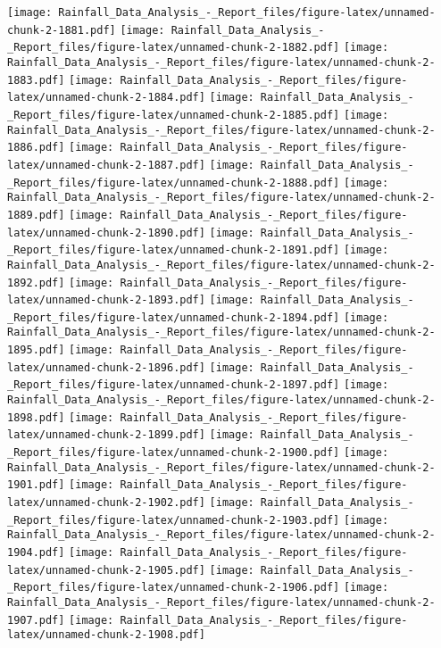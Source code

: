 \documentclass[
]{article}
\begin{document}
\texttt{[image: Rainfall\_Data\_Analysis\_-\_Report\_files/figure-latex/unnamed-chunk-2-1881.pdf]}
\texttt{[image: Rainfall\_Data\_Analysis\_-\_Report\_files/figure-latex/unnamed-chunk-2-1882.pdf]}
\texttt{[image: Rainfall\_Data\_Analysis\_-\_Report\_files/figure-latex/unnamed-chunk-2-1883.pdf]}
\texttt{[image: Rainfall\_Data\_Analysis\_-\_Report\_files/figure-latex/unnamed-chunk-2-1884.pdf]}
\texttt{[image: Rainfall\_Data\_Analysis\_-\_Report\_files/figure-latex/unnamed-chunk-2-1885.pdf]}
\texttt{[image: Rainfall\_Data\_Analysis\_-\_Report\_files/figure-latex/unnamed-chunk-2-1886.pdf]}
\texttt{[image: Rainfall\_Data\_Analysis\_-\_Report\_files/figure-latex/unnamed-chunk-2-1887.pdf]}
\texttt{[image: Rainfall\_Data\_Analysis\_-\_Report\_files/figure-latex/unnamed-chunk-2-1888.pdf]}
\texttt{[image: Rainfall\_Data\_Analysis\_-\_Report\_files/figure-latex/unnamed-chunk-2-1889.pdf]}
\texttt{[image: Rainfall\_Data\_Analysis\_-\_Report\_files/figure-latex/unnamed-chunk-2-1890.pdf]}
\texttt{[image: Rainfall\_Data\_Analysis\_-\_Report\_files/figure-latex/unnamed-chunk-2-1891.pdf]}
\texttt{[image: Rainfall\_Data\_Analysis\_-\_Report\_files/figure-latex/unnamed-chunk-2-1892.pdf]}
\texttt{[image: Rainfall\_Data\_Analysis\_-\_Report\_files/figure-latex/unnamed-chunk-2-1893.pdf]}
\texttt{[image: Rainfall\_Data\_Analysis\_-\_Report\_files/figure-latex/unnamed-chunk-2-1894.pdf]}
\texttt{[image: Rainfall\_Data\_Analysis\_-\_Report\_files/figure-latex/unnamed-chunk-2-1895.pdf]}
\texttt{[image: Rainfall\_Data\_Analysis\_-\_Report\_files/figure-latex/unnamed-chunk-2-1896.pdf]}
\texttt{[image: Rainfall\_Data\_Analysis\_-\_Report\_files/figure-latex/unnamed-chunk-2-1897.pdf]}
\texttt{[image: Rainfall\_Data\_Analysis\_-\_Report\_files/figure-latex/unnamed-chunk-2-1898.pdf]}
\texttt{[image: Rainfall\_Data\_Analysis\_-\_Report\_files/figure-latex/unnamed-chunk-2-1899.pdf]}
\texttt{[image: Rainfall\_Data\_Analysis\_-\_Report\_files/figure-latex/unnamed-chunk-2-1900.pdf]}
\texttt{[image: Rainfall\_Data\_Analysis\_-\_Report\_files/figure-latex/unnamed-chunk-2-1901.pdf]}
\texttt{[image: Rainfall\_Data\_Analysis\_-\_Report\_files/figure-latex/unnamed-chunk-2-1902.pdf]}
\texttt{[image: Rainfall\_Data\_Analysis\_-\_Report\_files/figure-latex/unnamed-chunk-2-1903.pdf]}
\texttt{[image: Rainfall\_Data\_Analysis\_-\_Report\_files/figure-latex/unnamed-chunk-2-1904.pdf]}
\texttt{[image: Rainfall\_Data\_Analysis\_-\_Report\_files/figure-latex/unnamed-chunk-2-1905.pdf]}
\texttt{[image: Rainfall\_Data\_Analysis\_-\_Report\_files/figure-latex/unnamed-chunk-2-1906.pdf]}
\texttt{[image: Rainfall\_Data\_Analysis\_-\_Report\_files/figure-latex/unnamed-chunk-2-1907.pdf]}
\texttt{[image: Rainfall\_Data\_Analysis\_-\_Report\_files/figure-latex/unnamed-chunk-2-1908.pdf]}
\end{document}
